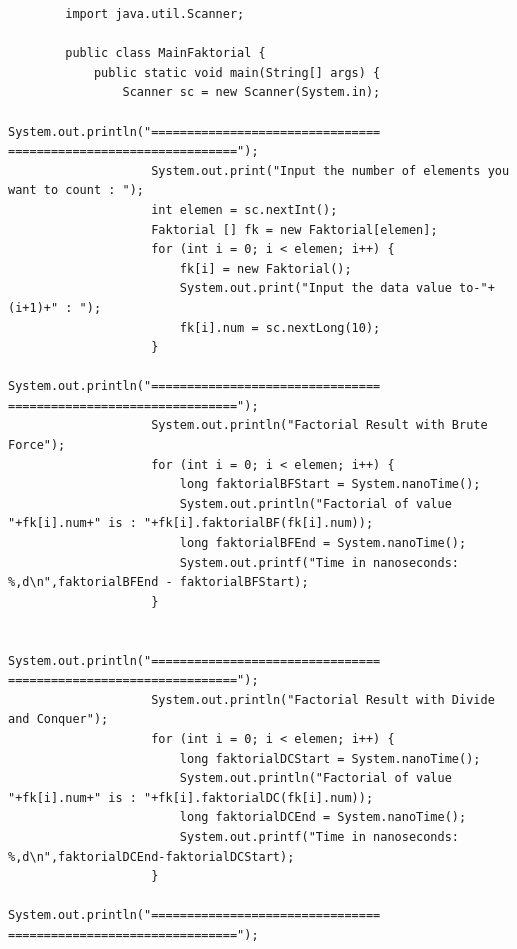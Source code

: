 \documentclass[12pt,titlepage]{article}
\begin{document}
\begin{enumerate}
\begin{verbatim}
        import java.util.Scanner;

        public class MainFaktorial {
            public static void main(String[] args) {
                Scanner sc = new Scanner(System.in);
                    System.out.println("================================ ================================");
                    System.out.print("Input the number of elements you want to count : ");
                    int elemen = sc.nextInt();
                    Faktorial [] fk = new Faktorial[elemen];
                    for (int i = 0; i < elemen; i++) {
                        fk[i] = new Faktorial();
                        System.out.print("Input the data value to-"+(i+1)+" : ");
                        fk[i].num = sc.nextLong(10);
                    }
                    System.out.println("================================ ================================");
                    System.out.println("Factorial Result with Brute Force");
                    for (int i = 0; i < elemen; i++) {
                        long faktorialBFStart = System.nanoTime();
                        System.out.println("Factorial of value "+fk[i].num+" is : "+fk[i].faktorialBF(fk[i].num));
                        long faktorialBFEnd = System.nanoTime();
                        System.out.printf("Time in nanoseconds: %,d\n",faktorialBFEnd - faktorialBFStart);
                    }
                    
                    System.out.println("================================ ================================");
                    System.out.println("Factorial Result with Divide and Conquer");
                    for (int i = 0; i < elemen; i++) {
                        long faktorialDCStart = System.nanoTime();
                        System.out.println("Factorial of value "+fk[i].num+" is : "+fk[i].faktorialDC(fk[i].num));
                        long faktorialDCEnd = System.nanoTime();
                        System.out.printf("Time in nanoseconds: %,d\n",faktorialDCEnd-faktorialDCStart);
                    }
                    System.out.println("================================ ================================");


\end{verbatim}
\end{enumerate}
\end{document}
